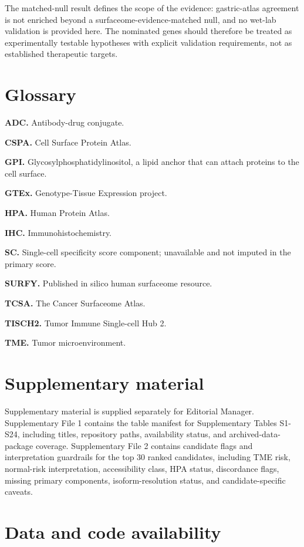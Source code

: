 \documentclass[review,12pt,authoryear]{elsarticle}
\begin{document}
The matched-null result defines the scope of the evidence: gastric-atlas agreement is not enriched beyond a surfaceome-evidence-matched null, and no wet-lab validation is provided here. The nominated genes should therefore be treated as experimentally testable hypotheses with explicit validation requirements, not as established therapeutic targets.

\FloatBarrier
\section{Glossary}

\textbf{ADC.} Antibody-drug conjugate.

\textbf{CSPA.} Cell Surface Protein Atlas.

\textbf{GPI.} Glycosylphosphatidylinositol, a lipid anchor that can attach proteins to the cell surface.

\textbf{GTEx.} Genotype-Tissue Expression project.

\textbf{HPA.} Human Protein Atlas.

\textbf{IHC.} Immunohistochemistry.

\textbf{SC.} Single-cell specificity score component;\allowbreak{} unavailable and not imputed in the primary score.

\textbf{SURFY.} Published in silico human surfaceome resource.

\textbf{TCSA.} The Cancer Surfaceome Atlas.

\textbf{TISCH2.} Tumor Immune Single-cell Hub 2.

\textbf{TME.} Tumor microenvironment.

\FloatBarrier
\section{Supplementary material}

Supplementary material is supplied separately for Editorial Manager. Supplementary File 1 contains the table manifest for Supplementary Tables S1-S24, including titles, repository paths, availability status, and archived-data-package coverage. Supplementary File 2 contains candidate flags and interpretation guardrails for the top 30 ranked candidates, including TME risk, normal-risk interpretation, accessibility class, HPA status, discordance flags, missing primary components, isoform-resolution status, and candidate-specific caveats.

\FloatBarrier
\section{Data and code availability}
\end{document}
